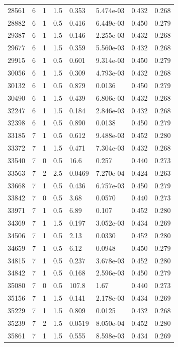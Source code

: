 \documentclass[preview]{standalone}
\begin{document}
{{{\begin{tabular}{L{1.2cm}C{1.2cm} C{0.3cm}C{0.5cm} C{1.4cm}C{1.4cm} C{1.4cm}C{1.4cm}}
  28561  &     6  & 1     & 1.5 &  0.353  & 5.474e-03  & 0.432 &  0.268   \\ 
  28882  &     6  & 1     & 0.5 &  0.416  & 6.449e-03  & 0.450 &  0.279   \\ 
  29387  &     6  & 1     & 1.5 &  0.146  & 2.255e-03  & 0.432 &  0.268   \\ 
  29677  &     6  & 1     & 1.5 &  0.359  & 5.560e-03  & 0.432 &  0.268   \\ 
  29915  &     6  & 1     & 0.5 &  0.601  & 9.314e-03  & 0.450 &  0.279   \\ 
  30056  &     6  & 1     & 1.5 &  0.309  & 4.793e-03  & 0.432 &  0.268   \\ 
  30132  &     6  & 1     & 0.5 &  0.879  & 0.0136  & 0.450 &  0.279   \\ 
  30490  &     6  & 1     & 1.5 &  0.439  & 6.806e-03  & 0.432 &  0.268   \\ 
  32247  &     6  & 1     & 1.5 &  0.184  & 2.846e-03  & 0.432 &  0.268   \\ 
  32398  &     6  & 1     & 0.5 &  0.890  & 0.0138  & 0.450 &  0.279   \\ 
  33185  &     7  & 1     & 0.5 &  0.612  & 9.488e-03  & 0.452 &  0.280   \\ 
  33372  &     7  & 1     & 1.5 &  0.471  & 7.304e-03  & 0.432 &  0.268   \\ 
  33540  &     7  & 0     & 0.5 &  16.6  & 0.257  & 0.440 &  0.273   \\ 
  33563  &     7  & 2     & 2.5 &  0.0469  & 7.270e-04  & 0.424 &  0.263   \\ 
  33668  &     7  & 1     & 0.5 &  0.436  & 6.757e-03  & 0.450 &  0.279   \\ 
  33842  &     7  & 0     & 0.5 &  3.68  & 0.0570  & 0.440 &  0.273   \\ 
  33971  &     7  & 1     & 0.5 &  6.89  & 0.107  & 0.452 &  0.280   \\ 
  34369  &     7  & 1     & 1.5 &  0.197  & 3.052e-03  & 0.434 &  0.269   \\ 
  34506  &     7  & 1     & 0.5 &  2.13  & 0.0330  & 0.452 &  0.280   \\ 
  34659  &     7  & 1     & 0.5 &  6.12  & 0.0948  & 0.450 &  0.279   \\ 
  34815  &     7  & 1     & 0.5 &  0.237  & 3.678e-03  & 0.452 &  0.280   \\ 
  34842  &     7  & 1     & 0.5 &  0.168  & 2.596e-03  & 0.450 &  0.279   \\ 
  35080  &     7  & 0     & 0.5 &  107.8  & 1.67  & 0.440 &  0.273   \\ 
  35156  &     7  & 1     & 1.5 &  0.141  & 2.178e-03  & 0.434 &  0.269   \\ 
  35229  &     7  & 1     & 1.5 &  0.809  & 0.0125  & 0.432 &  0.268   \\ 
  35239  &     7  & 2     & 1.5 &  0.0519  & 8.050e-04  & 0.452 &  0.280   \\ 
  35861  &     7  & 1     & 1.5 &  0.555  & 8.598e-03  & 0.434 &  0.269   \\ 
\hline 
\end{tabular} 

}}}
\end{document}
